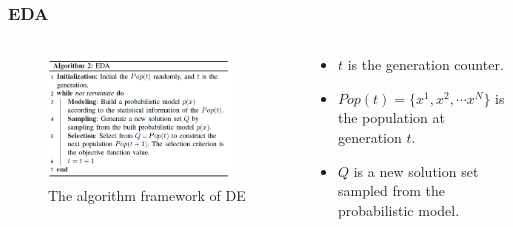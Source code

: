 \documentclass[xcolor=dvipsnames]{beamer}
\begin{document}
    \begin{frame}
    \frametitle{EDA}
    \begin{columns}
        \begin{column}{0.5\textwidth}
        \begin{figure}[H]
            \graphicspath{{figs/}}
            \includegraphics[width=0.9\textwidth]{eda.png}
            \caption{The algorithm framework of DE}
        \end{figure}
    \end{column}
    \begin{column}{0.5\textwidth}
    \begin{itemize}\small
    \setlength\itemsep{0em}
    \item $t$ is the generation counter.
    \item $Pop(t)=\{x^1,x^2, \cdots x^N\}$ is the population at generation $t$.
    \item $Q$ is a new solution set sampled from the probabilistic model.
    \end{itemize}
    \end{column}
    \end{columns}
    \end{frame}
\end{document}
